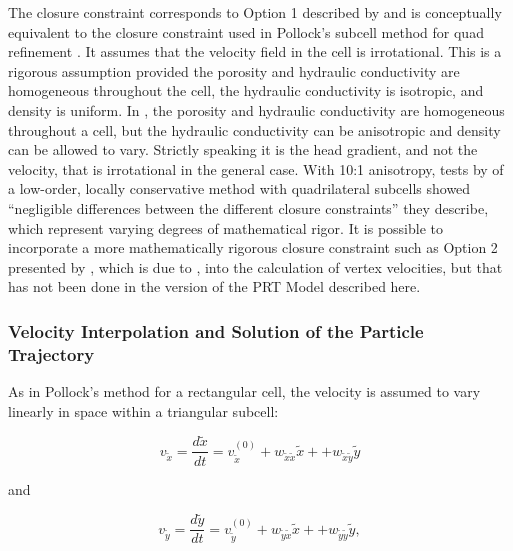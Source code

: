 The closure constraint corresponds to Option 1 described by \cite{zhang2012} and is conceptually equivalent to the closure constraint used in Pollock's subcell method for quad refinement \citep{pollock2015}. It assumes that the velocity field in the cell is irrotational. This is a rigorous assumption provided the porosity and hydraulic conductivity are homogeneous throughout the cell, the hydraulic conductivity is isotropic, and density is uniform. In \mf, the porosity and hydraulic conductivity are homogeneous throughout a cell, but the hydraulic conductivity can be anisotropic and density can be allowed to vary. Strictly speaking it is the head gradient, and not the velocity, that is irrotational in the general case. With 10:1 anisotropy, tests by \cite{zhang2012} of a low-order, locally conservative method with quadrilateral subcells showed ``negligible differences between the different closure constraints'' they describe, which represent varying degrees of mathematical rigor. It is possible to incorporate a more mathematically rigorous closure constraint such as Option 2 presented by \cite{zhang2012}, which is due to \cite{cordes1992}, into the calculation of vertex velocities, but that has not been done in the version of the PRT Model described here.

\subsubsection{Velocity Interpolation and Solution of the Particle Trajectory}

As in Pollock's method \citep{pollock2016modpath7} for a rectangular cell, the velocity is assumed to vary linearly in space within a triangular subcell:

\begin{equation}
v_{\tilde{x}} = \frac{d \tilde{x}}{dt} = v_{\tilde{x}}^{(0)} + w_{\tilde{x} \tilde{x}} \tilde{x} + + w_{\tilde{x} \tilde{y}} \tilde{y}
\label{eqn:vxlinear}
\end{equation}

\noindent and

\begin{equation}
v_{\tilde{y}} = \frac{d \tilde{y}}{dt} = v_{\tilde{y}}^{(0)} + w_{\tilde{y} \tilde{x}} \tilde{x} + + w_{\tilde{y} \tilde{y}} \tilde{y} ,
\label{eqn:vylinear}
\end{equation}

